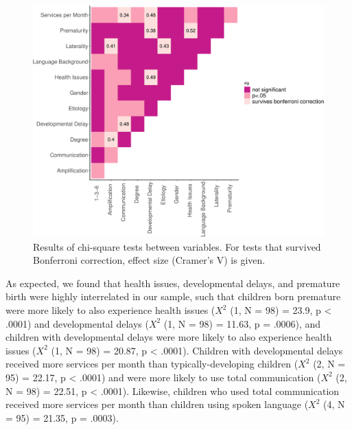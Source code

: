 \documentclass[english,man]{apa6}
\begin{document}
\begin{figure}
\centering
\includegraphics{ELSSP_paper_files/figure-latex/relationships-plot-1.pdf}
\caption{\label{fig:relationships-plot}Results of chi-square tests between variables. For tests that survived Bonferroni correction, effect size (Cramer's V) is given.}
\end{figure}

As expected, we found that health issues, developmental delays, and premature birth were highly interrelated in our sample, such that children born premature were more likely to also experience health issues (\(X^2\) (1, N = 98) = 23.9, p \textless{} .0001) and developmental delays (\(X^2\) (1, N = 98) = 11.63, p = .0006), and children with developmental delays were more likely to also experience health issues (\(X^2\) (1, N = 98) = 20.87, p \textless{} .0001). Children with developmental delays received more services per month than typically-developing children (\(X^2\) (2, N = 95) = 22.17, p \textless{} .0001) and were more likely to use total communication (\(X^2\) (2, N = 98) = 22.51, p \textless{} .0001). Likewise, children who used total communication received more services per month than children using spoken language (\(X^2\) (4, N = 95) = 21.35, p = .0003).
\end{document}
